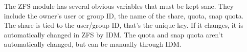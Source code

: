 \documentclass[letterpaper,12pt,titlepage]{article}
\begin{document}

The ZFS module has several obvious variables that must be kept sane. They include the owner's user or group ID, the name of the share, quota, snap quota. The share is tied to the user/group ID, that's the unique key. If it changes, it is automatically changed in ZFS by IDM. The quota and snap quota aren't automatically changed, but can be manually through IDM. 



\end{document}
